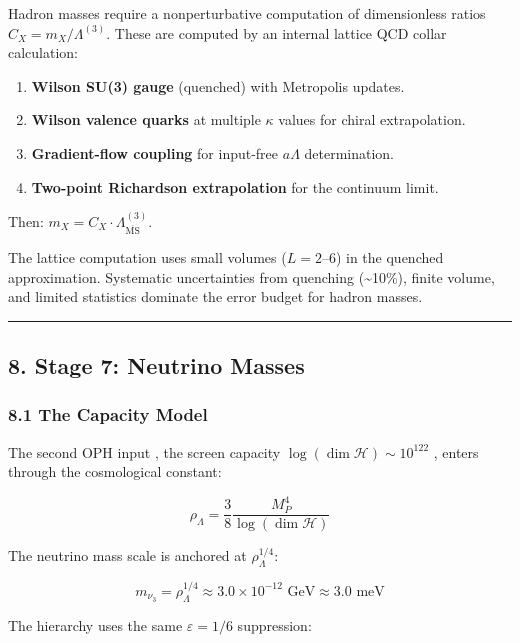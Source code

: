 Hadron masses require a nonperturbative computation of dimensionless ratios \(C_X = m_X / \Lambda^{(3)}\). These are computed by an internal lattice QCD collar calculation:

\begin{enumerate}
\def\labelenumi{\arabic{enumi}.}
\tightlist
\item
  \textbf{Wilson SU(3) gauge} (quenched) with Metropolis updates.
\item
  \textbf{Wilson valence quarks} at multiple \(\kappa\) values for chiral extrapolation.
\item
  \textbf{Gradient-flow coupling} for input-free \(a\Lambda\) determination.
\item
  \textbf{Two-point Richardson extrapolation} for the continuum limit.
\end{enumerate}

Then: \(m_X = C_X \cdot \Lambda_{\overline{\text{MS}}}^{(3)}\).

The lattice computation uses small volumes (\(L = 2\)--\(6\)) in the quenched approximation. Systematic uncertainties from quenching (\textasciitilde10\%), finite volume, and limited statistics dominate the error budget for hadron masses.

\begin{center}\rule{0.5\linewidth}{0.5pt}\end{center}

\subsection{8. Stage 7: Neutrino Masses}\label{8-stage-7-neutrino-masses}

\subsubsection{8.1 The Capacity Model}\label{81-the-capacity-model}

The second OPH input , the screen capacity \(\log(\dim\mathcal{H}) \sim 10^{122}\) , enters through the cosmological constant:

\[\rho_\Lambda = \frac{3}{8} \frac{M_P^4}{\log(\dim\mathcal{H})}\]

The neutrino mass scale is anchored at \(\rho_\Lambda^{1/4}\):

\[m_{\nu_3} = \rho_\Lambda^{1/4} \approx 3.0 \times 10^{-12} \text{ GeV} \approx 3.0 \text{ meV}\]

The hierarchy uses the same \(\varepsilon = 1/6\) suppression:

